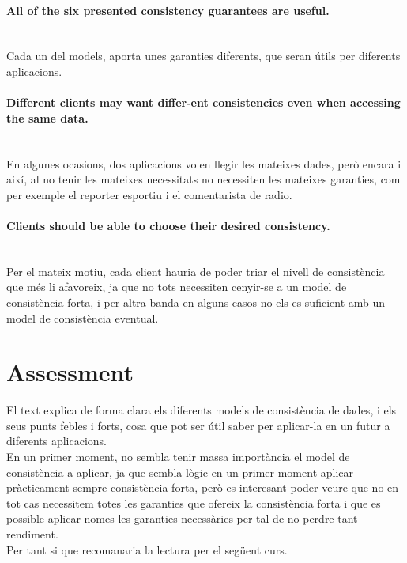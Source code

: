 \documentclass[a4paper, 10pt]{article}
\begin{document}
\paragraph{All of the six presented consistency guarantees are useful.\\\\}
Cada un del models, aporta unes garanties diferents, que seran útils per diferents aplicacions.
\paragraph{ Different clients may want differ-ent consistencies even when accessing
the same data.\\\\}

En algunes ocasions, dos aplicacions volen llegir les mateixes dades, però encara i així, al no tenir les mateixes necessitats no necessiten les mateixes garanties, com per exemple el reporter esportiu i el comentarista de radio.



\paragraph{Clients should be able to choose their desired consistency.\\\\}


Per el mateix motiu, cada client hauria de poder triar el nivell de consistència que més li afavoreix, ja que no tots necessiten cenyir-se a un model de consistència forta, i per altra banda en alguns casos no els es suficient amb un model de consistència eventual.

\section{Assessment}

El text explica de forma clara els diferents models de consistència de dades, i els seus punts febles i forts, cosa que pot ser útil saber per aplicar-la en un futur a diferents aplicacions.\\
En un primer moment, no sembla tenir massa importància el model de consistència a aplicar, ja que sembla lògic en un primer moment aplicar pràcticament sempre consistència forta, però es interesant poder veure que no en tot cas necessitem totes les garanties que ofereix la consistència forta i que es possible aplicar nomes les garanties necessàries per tal de no perdre tant rendiment.\\
Per tant si que recomanaria la lectura per el següent curs.
\end{document}
